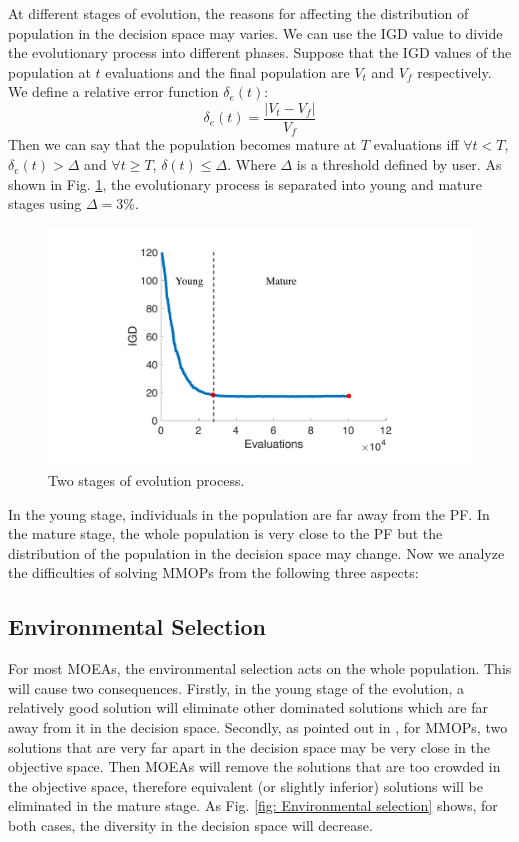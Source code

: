 \documentclass[conference]{IEEEtran}
\begin{document}
At different stages of evolution, the reasons for affecting the distribution of population in the decision space may varies. We can use the IGD\cite{zhang2008rm} value to divide the evolutionary process into different phases. Suppose that the IGD values of the population at $t$ evaluations and the final population are $V_t$ and $V_f$ respectively. We define a relative error function $\delta_e(t)$:
$$\delta_e(t)=\frac{|V_t-V_f|}{V_f}$$
Then we can say that the population becomes mature at $T$ evaluations iff $\forall t<T$, $\delta_e(t)>\Delta$ and $\forall t \ge T$, $\delta(t) \leq \Delta$. Where $\Delta$ is a threshold defined by user. As shown in Fig. \ref{fig: Two stages}, the evolutionary process is separated into young and mature stages using $\Delta=3\%$.
\begin{figure}[htbp]
    \centering
    \includegraphics[width=.35\textwidth]{Section3/Stages}
    \caption{Two stages of evolution process.}
    \label{fig: Two stages}
\end{figure}

In the young stage, individuals in the population are far away from the PF. In the mature stage, the whole population is very close to the PF but the distribution of the population in the decision space may change. Now we analyze the difficulties of solving MMOPs from the following three aspects:

\subsection{Environmental Selection}
\label{Impact of environmental selection}
For most MOEAs, the environmental selection acts on the whole population. This will cause two consequences.
Firstly, in the young stage of the evolution, a relatively good solution will eliminate other dominated solutions which are far away from it in the decision space. Secondly, as pointed out in \cite{liang2016multimodal}, for MMOPs, two solutions that are very far apart in the decision space may be very close in the objective space. Then MOEAs will remove the solutions that are too crowded in the objective space, therefore equivalent (or slightly inferior) solutions will be eliminated in the mature stage. As Fig. \ref{fig: Environmental selection} shows, for both cases, the diversity in the decision space will decrease. 
\end{document}
